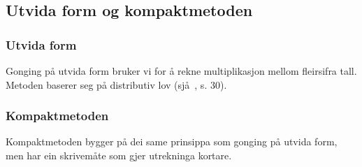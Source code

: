 \subsection{Utvida form og kompaktmetoden}
\subsubsection{Utvida form}
Gonging på utvida form bruker vi for å rekne multiplikasjon mellom fleirsifra tall. Metoden baserer seg på distributiv lov (sjå \mb\,, s. 30). \regv
{}
\newpage
{}
\subsubsection{Kompaktmetoden}
Kompaktmetoden bygger på dei same prinsippa som gonging på utvida form, men har ein skrivemåte som gjer utrekninga kortare. \regv

